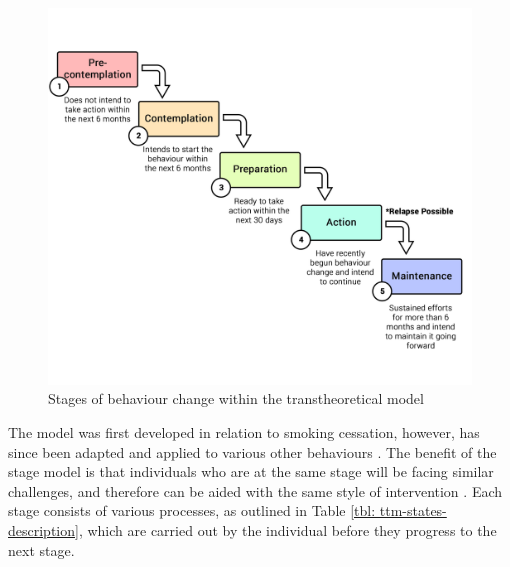 \begin{figure}[h]
    \centering
    \includegraphics[scale=0.16, angle=0]{Files/prevention-study-1/figures/ttm-stages-model}
    \caption{Stages of behaviour change within the transtheoretical model}
    \label{fig: ttm-model}
\end{figure}


The model was first developed in relation to smoking cessation, however, has since been adapted and applied to various other behaviours \cite{Nisbet2008}. The benefit of the stage model is that individuals who are at the same stage will be facing similar challenges, and therefore can be aided with the same style of intervention \cite{Morris2012a}. Each stage consists of various processes, as outlined in Table \ref{tbl: ttm-states-description}, which are carried out by the individual before they progress to the next stage.

